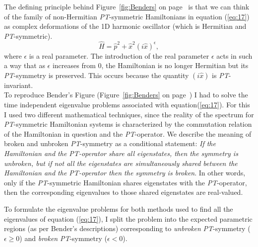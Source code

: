 \documentclass[10pt, a4paper, singlespacing, headsepline]{article}
\newcommand\PT{\textit{PT}}
\begin{document}
The defining principle behind Figure~\ref{fig:Benders} on page~\pageref{fig:Benders} is that we can think of the family of non-Hermitian \PT-symmetric Hamiltonians in equation (\ref{eq:17}) as complex deformations of the 1D harmonic oscillator (which is Hermitian and \PT-symmetric).
\begin{equation}\label{eq:17}
\hat{H} = \hat{p}^2 + \hat{x}^2 (i \hat{x})^{\epsilon},
\end{equation}
where $\epsilon$ is a real parameter. The introduction of the real parameter $\epsilon$ acts in such a way that as $\epsilon$ increases from $0$, the Hamiltonian is no longer Hermitian but its \PT-symmetry is preserved. This occurs because the quantity $(i\hat{x})$ is \PT-invariant\cite{BenderPT}\cite{Bender}.\\ 
To reproduce Bender's Figure (Figure~\ref{fig:Benders} on page~\pageref{fig:Benders}) I had to solve the time independent eigenvalue problems associated with equation(\ref{eq:17}). For this I used two different mathematical techniques, since the reality of the spectrum for \PT-symmetric Hamiltonian systems is characterized by the commutation relation of the Hamiltonian in question and the \PT-operator. We describe the meaning of broken and unbroken \PT-symmetry as a conditional statement: \textit{If the Hamiltonian and the \PT-operator share all eigenstates, then the symmetry is unbroken, but if not all the eigenstates are simultaneously shared between the Hamiltonian and the \PT-operator then the symmetry is broken}\cite{BenderPT}\cite{Bender}. In other words, only if the \PT-symmetric Hamiltonian shares eigenstates with the \PT-operator, then the corresponding eigenvalues to those shared eigenstates are real-valued.

To formulate the eigenvalue problems for both methods used to find all the eigenvalues of equation (\ref{eq:17}), I split the problem into the expected parametric regions (as per Bender's descriptions) corresponding to \textit{unbroken} \PT-symmetry ($\epsilon \geq 0$) and \textit{broken} \PT-symmetry ($\epsilon < 0$).
\end{document}
